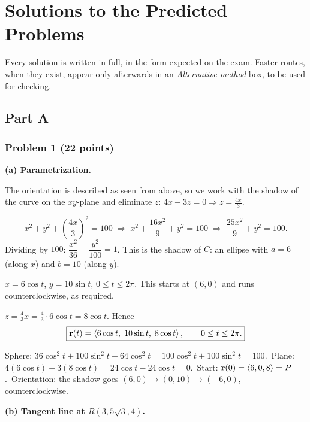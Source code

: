 \section{Solutions to the Predicted Problems}\label{ch:predsol}

Every solution is written in full, in the form expected on the exam. Faster
routes, when they exist, appear only afterwards in an \emph{Alternative
method} box, to be used for checking.

\subsection{Part A}

\subsubsection*{Problem 1 (22 points)}

\textbf{(a) Parametrization.}

 The orientation is described as seen
from above, so we work with the shadow of the curve on the $xy$-plane and
eliminate $z$: $4x-3z=0\Rightarrow z=\frac{4x}{3}$.

\[
  x^2+y^2+\left(\frac{4x}{3}\right)^2=100
  \;\Longrightarrow\;x^2+\frac{16x^2}{9}+y^2=100
  \;\Longrightarrow\;\frac{25x^2}{9}+y^2=100 .
\]
Dividing by $100$: $\dfrac{x^2}{36}+\dfrac{y^2}{100}=1$. This is the shadow of $C$: an
ellipse with $a=6$ (along $x$) and $b=10$ (along $y$).

 $x=6\cos t$, $y=10\sin t$, $0\le t\le2\pi$. This
starts at $(6,0)$ and runs counterclockwise, as required.

 $z=\frac43x=\frac43\cdot6\cos t=8\cos t$. Hence
\[
  \boxed{\mathbf{r}(t)=\left\langle 6\cos t,\;10\sin t,\;8\cos t \right\rangle,\qquad0\le t\le2\pi .}
\]

 Sphere: $36\cos^2t+100\sin^2t+64\cos^2t=100\cos^2t+100\sin^2t=100$.\checkok\
Plane: $4(6\cos t)-3(8\cos t)=24\cos t-24\cos t=0$.\checkok\
Start: $\mathbf{r}(0)=\left\langle 6,0,8 \right\rangle=P$.\checkok\
Orientation: the shadow goes $(6,0)\to(0,10)\to(-6,0)$, counterclockwise.\checkok

\textbf{(b) Tangent line at $R(3,5\sqrt3,4)$.}

